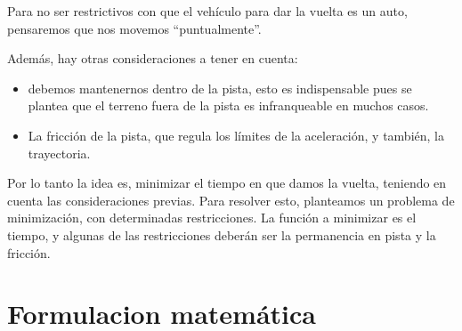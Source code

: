 \documentclass[a4paper,10pt]{book}
\begin{document}
Para no ser restrictivos con que el vehículo para dar la vuelta es un auto, pensaremos que nos movemos ``puntualmente''.

Además, hay otras consideraciones a tener en cuenta:
\begin{itemize}
 \item debemos mantenernos dentro de la pista, esto es indispensable pues se plantea que el terreno fuera de la pista es infranqueable en muchos casos.

 \item La fricción de la pista, que regula los límites de la aceleración, y también, la trayectoria.
\end{itemize}
Por lo tanto la idea es, minimizar el tiempo en que damos la vuelta, teniendo en cuenta las consideraciones previas.
Para resolver esto, planteamos un problema de minimización, con determinadas restricciones. La función a minimizar es el tiempo, y algunas de las restricciones deberán ser la permanencia en pista y la fricción.
\section{Formulacion matemática}
\end{document}
